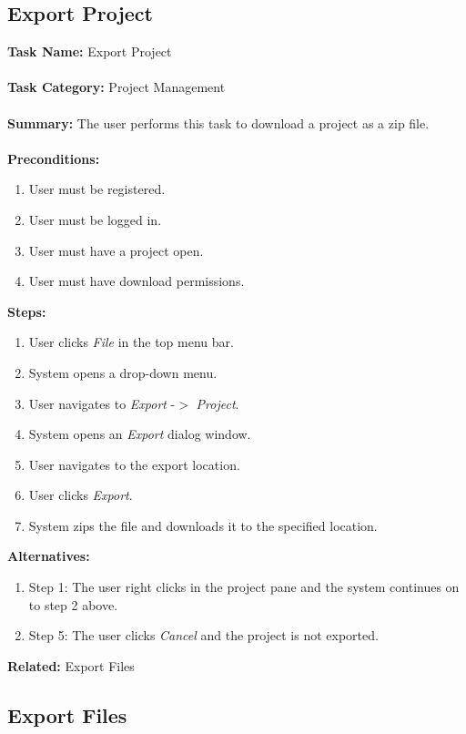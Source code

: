 \documentclass[14pt, a4paper]{article}
\begin{document}
\newpage

\subsection{Export Project}

\begin{framed}
	\noindent\textbf{Task Name:} Export Project \\ \\
	\textbf{Task Category:} Project Management \\ \\
	\textbf{Summary:} The user performs this task to download a project as a zip file. \\ \\
	\textbf{Preconditions:} 
	\begin{enumerate}
		\item User must be registered.
		\item User must be logged in.
		\item User must have a project open.
		\item User must have download permissions.
	\end{enumerate}
	\textbf{Steps:}
	\begin{enumerate}
		\item User clicks \textit{File} in the top menu bar.
		\item System opens a drop-down menu.
		\item User navigates to \textit{Export} -$>$ \textit{Project}.
		\item System opens an \textit{Export} dialog window.
		\item User navigates to the export location.
		\item User clicks \textit{Export}.
		\item System zips the file and downloads it to the specified location.
	\end{enumerate}
	\textbf{Alternatives:} 
	\begin{enumerate}
		\item Step 1: The user right clicks in the project pane and the system continues on to step 2 above.
		\item Step 5: The user clicks \textit{Cancel} and the project is not exported.
	\end{enumerate}
	\textbf{Related:} Export Files
\end{framed}

\newpage

\subsection{Export Files}
\end{document}
